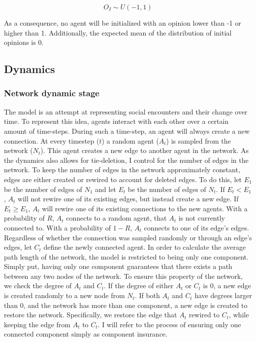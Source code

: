 \documentclass{article}
\begin{document}
$$O_I \sim U(-1, 1)$$

\noindent As a consequence, no agent will be initialized with an opinion lower than -1 or higher than 1. Additionally, the expected mean of the distribution of initial opinions is 0.

\subsection{Dynamics}

\subsubsection{Network dynamic stage }

The model is an attempt at representing social encounters and their change over time. 
To represent this idea, agents interact with each other over a certain amount of time-steps. 
During such a time-step, an agent will always create a new connection. 
At every timestep ($t$) a random agent ($A_t$) is sampled from the network ($N_t$). This agent creates a new edge to another agent in the network. 
As the dynamics also allows for tie-deletion, I control for the number of edges in the network.
To keep the number of edges in the network approximately constant, edges are either created or rewired to account for deleted edges. 
To do this, let $E_1$ be the number of edges of $N_1$ and let $E_t$ be the number of edges of $N_t$. 
If $E_t < E_1$, $A_t$ will not rewire one of its existing edges, but instead create a new edge. If $E_t \geq E_1$, $A_t$ will rewire one of its existing connections to the new agents.
With a probability of $R$, $A_t$ connects to a random agent, that $A_t$ is not currently connected to. 
With a probability of $1-R$, $A_t$ connects to one of its edge's edges. Regardless of whether the connection was sampled randomly or through an edge's edges, let $C_t$ define the newly connected agent. In order to calculate the average path length of the network, the model is restricted to being only one component. 
Simply put, having only one component guarantees that there exists a path between any two nodes of the network.
To ensure this property of the network, we check the degree of $A_t$ and $C_t$. If the degree of either $A_t$ or $C_t$ is 0, a new edge is created randomly to a new node from $N_t$.
If both $A_t$ and $C_t$ have degrees larger than 0, and the network has more than one component, a new edge is created to restore the network. Specifically, we restore the edge that $A_t$ rewired to $C_t$, while keeping the edge from $A_t$ to $C_t$.
I will refer to the process of ensuring only one connected component simply as component insurance. 
\end{document}
